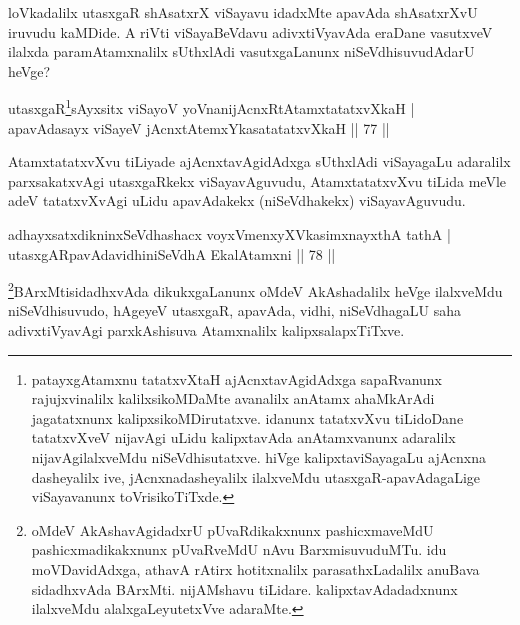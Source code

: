 \begin{artha}
loVkadalilx utasxgaR shAsatxrX viSayavu idadxMte apavAda shAsatxrXvU iruvudu kaMDide. A riVti viSayaBeVdavu adivxtiVyavAda  eraDane vasutxveV ilalxda paramAtamxnalilx sUthxlAdi vasutxgaLanunx niSeVdhisuvudAdarU heVge?
\end{artha}

 
\begin{shl}
utasxgaR\footnote{patayxgAtamxnu tatatxvXtaH ajAcnxtavAgidAdxga sapaRvanunx rajujxvinalilx kalilxsikoMDaMte avanalilx anAtamx ahaMkArAdi jagatatxnunx kalipxsikoMDirutatxve. idanunx tatatxvXvu tiLidoDane tatatxvXveV nijavAgi uLidu kalipxtavAda anAtamxvanunx adaralilx nijavAgilalxveMdu niSeVdhisutatxve. hiVge kalipxtaviSayagaLu ajAcnxna dasheyalilx ive, jAcnxnadasheyalilx ilalxveMdu utasxgaR-apavAdagaLige viSayavanunx toVrisikoTiTxde.}sAyxsitx viSayoV yoVnanijAcnxRtAtamxtatatxvXkaH |\\
apavAdasayx viSayeV jAcnxtAtemxYkasatatatxvXkaH \hfill || 77 ||
\end{shl}

\begin{artha}
AtamxtatatxvXvu tiLiyade ajAcnxtavAgidAdxga sUthxlAdi viSayagaLu adaralilx parxsakatxvAgi utasxgaRkekx viSayavAguvudu, AtamxtatatxvXvu tiLida meVle adeV tatatxvXvAgi uLidu apavAdakekx (niSeVdhakekx) viSayavAguvudu.
\end{artha}

\begin{shl}
adhayxsatxdikninxSeVdhashacx voyxVmenxyXVkasimxnayxthA tathA |\\
utasxgARpavAdavidhiniSeVdhA EkalAtamxni \hfill || 78 ||
\end{shl}

\begin{artha}%
\footnote{oMdeV AkAshavAgidadxrU pUvaRdikakxnunx pashicxmaveMdU pashicxmadikakxnunx pUvaRveMdU nAvu BarxmisuvuduMTu. idu moVDavidAdxga, athavA rAtirx hotitxnalilx parasathxLadalilx anuBava sidadhxvAda BArxMti. nijAMshavu tiLidare. kalipxtavAdadadxnunx ilalxveMdu alalxgaLeyutetxVve adaraMte.}BArxMtisidadhxvAda dikukxgaLanunx oMdeV AkAshadalilx heVge ilalxveMdu niSeVdhisuvudo, hAgeyeV utasxgaR, apavAda, vidhi, niSeVdhagaLU saha adivxtiVyavAgi parxkAshisuva Atamxnalilx kalipxsalapxTiTxve.
\end{artha}


